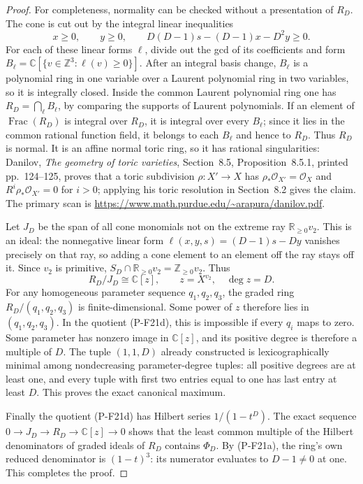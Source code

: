 \documentclass[11pt,a4paper]{article}
\begin{document}
\begin{proof}
For completeness, normality can be checked without a presentation
of $R_D$. The cone is cut out by the integral linear inequalities
\[
 x\ge0,\qquad y\ge0,\qquad
 D(D-1)s-(D-1)x-D^2y\ge0.
\]
For each of these linear forms $\ell$, divide out the gcd of its
coefficients and form
$B_\ell=\mathbb C[\{v\in\mathbb Z^3:\ell(v)\ge0\}]$.
After an integral basis change, $B_\ell$ is a polynomial ring in
one variable over a Laurent polynomial ring in two variables, so
it is integrally closed. Inside the common Laurent polynomial
ring one has
$R_D=\bigcap_\ell B_\ell$, by comparing the supports of Laurent
polynomials. If an element of $\operatorname{Frac}(R_D)$ is integral
over $R_D$, it is integral over every $B_\ell$; since it lies in
the common rational function field, it belongs to each $B_\ell$
and hence to $R_D$. Thus $R_D$ is normal. It is an affine normal
toric ring, so it has rational singularities: Danilov,
\emph{The geometry of toric varieties}, Section~8.5,
Proposition~8.5.1, printed pp.~124--125, proves that a toric
subdivision $\rho:X'\to X$ has
$\rho_*\mathcal O_{X'}=\mathcal O_X$ and
$R^i\rho_*\mathcal O_{X'}=0$ for $i>0$; applying his toric
resolution in Section~8.2 gives the claim. The primary scan is
\url{https://www.math.purdue.edu/~arapura/danilov.pdf}.

Let $J_D$ be the span of all cone monomials not on the extreme ray
$\mathbb R_{\ge0}v_2$. This is an ideal: the nonnegative linear
form $\ell(x,y,s)=(D-1)s-Dy$ vanishes precisely on that ray,
so adding a cone element to an element off the ray stays off it.
Since $v_2$ is primitive, $S_D\cap\mathbb R_{\ge0}v_2
=\mathbb Z_{\ge0}v_2$. Thus
\[
 R_D/J_D\cong\mathbb C[z],\qquad z=X^{v_2},\quad\deg z=D.
 \tag{P-F21d}
\]
For any homogeneous parameter sequence $q_1,q_2,q_3$, the graded
ring $R_D/(q_1,q_2,q_3)$ is finite-dimensional. Some power of
$z$ therefore lies in $(q_1,q_2,q_3)$. In the quotient (P-F21d),
this is impossible if every $q_i$ maps to zero. Some parameter
has nonzero image in $\mathbb C[z]$, and its positive degree is
therefore a multiple of $D$. The tuple $(1,1,D)$ already
constructed is lexicographically minimal among nondecreasing
parameter-degree tuples: all positive degrees are at least one,
and every tuple with first two entries equal to one has last entry
at least $D$. This proves the exact canonical maximum.

Finally the quotient (P-F21d) has Hilbert series $1/(1-t^D)$.
The exact sequence $0\to J_D\to R_D\to\mathbb C[z]\to0$
shows that the least common multiple of the Hilbert denominators
of graded ideals of $R_D$ contains $\Phi_D$. By (P-F21a), the
ring's own reduced denominator is $(1-t)^3$: its numerator
evaluates to $D-1\ne0$ at one. This completes the proof.
\end{proof}
\end{document}
